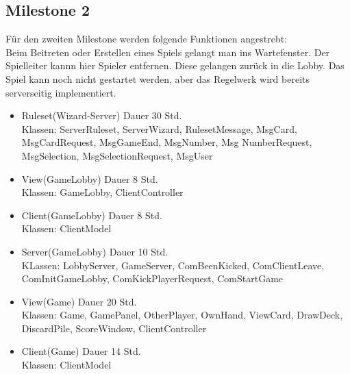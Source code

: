 \documentclass{article}
\begin{document}
\subsection{Milestone 2}
Für den zweiten Milestone werden folgende Funktionen angestrebt:\\
Beim Beitreten oder Erstellen eines Spiels gelangt man ins Wartefenster. Der Spielleiter kannn hier Spieler entfernen. Diese gelangen zurück in die Lobby. Das Spiel kann noch nicht gestartet werden, aber das Regelwerk wird bereits serverseitig implementiert.\\
\begin{itemize}
\item Ruleset(Wizard-Server) Dauer 30 Std. \\
Klassen: ServerRuleset, ServerWizard, RulesetMessage, MsgCard, MsgCardRequest, MsgGameEnd, MsgNumber, Msg NumberRequest, MsgSelection, MsgSelectionRequest, MsgUser
\item View(GameLobby) Dauer 8 Std. \\
Klassen: GameLobby, ClientController
\item Client(GameLobby) Dauer 8 Std. \\
Klassen: ClientModel
\item Server(GameLobby) Dauer 10 Std. \\
KLassen: LobbyServer, GameServer, ComBeenKicked, ComClientLeave, ComInitGameLobby, ComKickPlayerRequest, ComStartGame
\item View(Game) Dauer 20 Std. \\
Klassen: Game, GamePanel, OtherPlayer, OwnHand, ViewCard, DrawDeck, DiscardPile, ScoreWindow, ClientController
\item Client(Game) Dauer 14 Std. \\
Klassen: ClientModel
\end{itemize}
\end{document}
